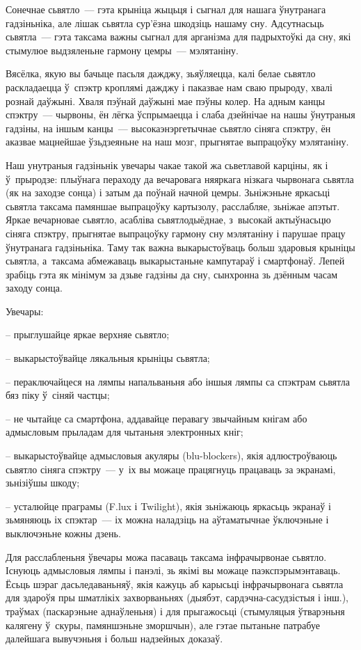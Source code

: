 Сонечнае сьвятло~--- гэта крыніца жыцьця і сыгнал для нашага ўнутранага гадзіньніка, але лішак сьвятла сур'ёзна шкодзіць нашаму сну. Адсутнасьць сьвятла~--- гэта таксама важны сыгнал для арганізма для падрыхтоўкі да сну, які стымулюе выдзяленьне гармону цемры~--- мэлятаніну.

Вясёлка, якую вы бачыце пасьля дажджу, зьяўляецца, калі белае сьвятло раскладаецца ў~спэктр кроплямі дажджу і паказвае нам сваю прыроду, хвалі рознай даўжыні. Хваля пэўнай даўжыні мае пэўны колер. На адным канцы спэктру~--- чырвоны, ён лёгка ўспрымаецца і слаба дзейнічае на нашы ўнутраныя гадзіны, на іншым канцы~--- высокаэнэргетычнае сьвятло сіняга спэктру, ён аказвае мацнейшае ўзьдзеяньне на наш мозг, прыгнятае выпрацоўку мэлятаніну.

Наш унутраныя гадзіньнік увечары чакае такой жа сьветлавой карціны, як і ў~прыродзе: плыўнага пераходу да вечаровага няяркага нізкага чырвонага сьвятла (як на заходзе сонца) і затым да поўнай начной цемры. Зьніжэньне яркасьці сьвятла таксама памяншае выпрацоўку картызолу, расслабляе, зьніжае апэтыт. Яркае вечарновае сьвятло, асабліва сьвятлодыёднае, з~высокай актыўнасьцю сіняга спэктру, прыгнятае выпрацоўку гармону сну мэлятаніну і парушае працу ўнутранага гадзіньніка. Таму так важна выкарыстоўваць больш здаровыя крыніцы сьвятла, а~таксама абмежаваць выкарыстаньне кампутараў і смартфонаў. Лепей зрабіць гэта як мінімум за дзьве гадзіны да сну, сынхронна зь дзённым часам заходу сонца.

Увечары:

– прыглушайце яркае верхняе сьвятло;

– выкарыстоўвайце лякальныя крыніцы сьвятла;

– пераключайцеся на лямпы напальваньня або іншыя лямпы са спэктрам сьвятла бяз піку ў~сіняй частцы;

– не чытайце са смартфона, аддавайце перавагу звычайным кнігам або адмысловым прыладам для чытаньня электронных кніг;

– выкарыстоўвайце адмысловыя акуляры (blu-blockers), якія адлюстроўваюць сьвятло сіняга спэктру~--- у~іх вы можаце працягнуць працаваць за экранамі, зьнізіўшы шкоду;

– усталюйце праграмы (F.lux і Twilight), якія зьніжаюць яркасьць экранаў і зьмяняюць іх спэктар~--- іх можна наладзіць на аўтаматычнае ўключэньне і выключэньне кожны дзень.

Для расслабленьня ўвечары можа пасаваць таксама інфрачырвонае сьвятло. Існуюць адмысловыя лямпы і панэлі, зь якімі вы можаце паэкспэрымэнтаваць. Ёсьць шэраг дасьледаваньняў, якія кажуць аб карысьці інфрачырвонага сьвятла для здароўя пры шматлікіх захворваньнях (дыябэт, сардэчна-сасудзістыя і інш.), траўмах (паскарэньне аднаўленьня) і для прыгажосьці (стымуляцыя ўтварэньня калягену ў~скуры, памяншэньне зморшчын), але гэтае пытаньне патрабуе далейшага вывучэньня і больш надзейных доказаў. 

